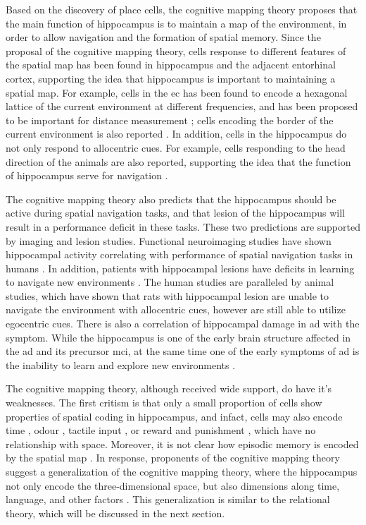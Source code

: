 Based on the discovery of place cells, the cognitive mapping theory proposes that the main function of hippocampus is to maintain a map of the environment, in order to allow navigation and the formation of spatial memory. Since the proposal of the cognitive mapping theory, cells response to different features of the spatial map has been found in hippocampus and the adjacent entorhinal cortex, supporting the idea that hippocampus is important to maintaining a spatial map. For example, cells in the \gls{ec} has been found to encode a hexagonal lattice of the current environment at different frequencies, and has been proposed to be important for distance measurement \citep{fyhn04, hafting05, moser15}; cells encoding the border of the current environment is also reported \citep{solstad08}. In addition, cells in the hippocampus do not only respond to allocentric cues. For example, cells responding to the head direction of the animals are also reported, supporting the idea that the function of hippocampus serve for navigation \citep{sargolini06}. 

The cognitive mapping theory also predicts that the hippocampus should be active during spatial navigation tasks, and that lesion of the hippocampus will result in a performance deficit in these tasks. These two predictions are supported by imaging and lesion studies. Functional neuroimaging studies have shown hippocampal activity correlating with performance of spatial navigation tasks in humans \citep{burgess02, hartley07}. In addition, patients with hippocampal lesions have deficits in learning to navigate new environments \citep{hartley07}. The human studies are paralleled by animal studies, which have shown that rats with hippocampal lesion are unable to navigate the environment with allocentric cues, however are still able to utilize egocentric cues\citep{morris06}. There is also a correlation of hippocampal damage in \gls{ad} with the symptom. While the hippocampus is one of the early brain structure affected in the \gls{ad} and its precursor \gls{mci}, at the same time one of the early symptoms of \gls{ad} is the inability to learn and explore new environments \citep{vlcek14}.

The cognitive mapping theory, although received wide support, do have it's weaknesses. The first critism is that only a small proportion of cells show properties of spatial coding in hippocampus, and infact, cells may also encode time \citep{hampson93}, odour \citep{wood99}, tactile input \citep{young94}, or reward and punishment \citep{moser08}, which have no relationship with space. Moreover, it is not clear how episodic memory is encoded by the spatial map \citep{konkel09}. In response, proponents of the cognitive mapping theory suggest a generalization of the cognitive mapping theory, where the hippocampus not only encode the three-dimensional space, but also dimensions along time, language, and other factors \citep{burgess02}. This generalization is similar to the relational theory, which will be discussed in the next section.

